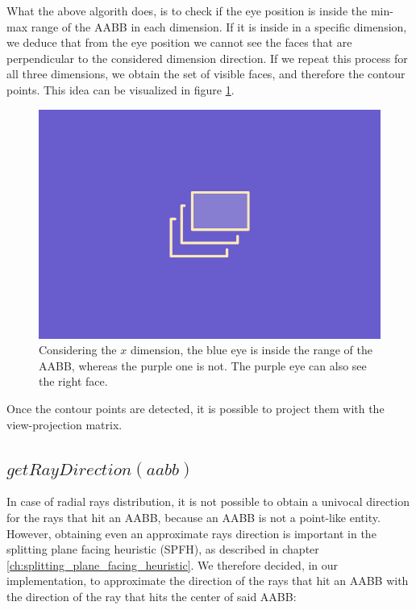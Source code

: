 \documentclass{PoliMi_MasterThesis}
\begin{document}
What the above algorith does, is to check if the eye position is inside the min-max range of the AABB in each dimension. If it is inside in a specific dimension, we deduce that from the eye position we cannot see the faces that are perpendicular to the considered dimension direction. If we repeat this process for all three dimensions, we obtain the set of visible faces, and therefore the contour points. This idea can be visualized in figure \ref{fig:visible_faces_from_eye}.

\begin{figure}[H]
	\centering
	\includegraphics[width=\textwidth*\real{0.7}]{Images/TODO.png}
	\caption{Considering the $x$ dimension, the blue eye is inside the range of the AABB, whereas the purple one is not. The purple eye can also see the right face.}
	\label{fig:visible_faces_from_eye}
\end{figure}

Once the contour points are detected, it is possible to project them with the view-projection matrix.

\subsection*{$getRayDirection(aabb)$}
In case of radial rays distribution, it is not possible to obtain a univocal direction for the rays that hit an AABB, because an AABB is not a point-like entity. However, obtaining even an approximate rays direction is important in the splitting plane facing heuristic (SPFH), as described in chapter \ref{ch:splitting_plane_facing_heuristic}. We therefore decided, in our implementation, to approximate the direction of the rays that hit an AABB with the direction of the ray that hits the center of said AABB:
\end{document}
